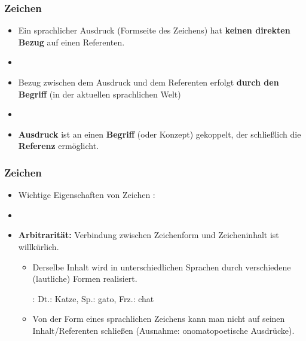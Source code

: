 \begin{frame}
	
\end{frame}	



\begin{frame}
\frametitle{Zeichen}

\begin{itemize}
	\item Ein sprachlicher Ausdruck (Formseite des Zeichens) hat \textbf{keinen direkten Bezug} auf einen Referenten.
	
	\item []	
	
	\item Bezug zwischen dem Ausdruck und dem Referenten erfolgt \textbf{durch den Begriff} (in der aktuellen sprachlichen Welt)
	
	\item[]
	
	\item \textbf{Ausdruck} ist an einen \textbf{Begriff} (oder Konzept) gekoppelt, der schließlich die \textbf{Referenz} ermöglicht.
		
\end{itemize}
	
\end{frame}


\begin{frame}
\frametitle{Zeichen}

\begin{itemize}
	\item Wichtige Eigenschaften von Zeichen \citep[vgl.][]{Saussure16x}:
	
	\item[]
		
	\item \textbf{Arbitrarität:} Verbindung zwischen Zeichenform und Zeicheninhalt ist willkürlich.
	
	\begin{itemize}
		\item Derselbe Inhalt wird in unterschiedlichen Sprachen durch verschiedene (lautliche) Formen realisiert.
		
		\ea {}: Dt.: Katze, Sp.: gato, Frz.: chat
		\z 
		
		\item Von der Form eines sprachlichen Zeichens kann man nicht auf seinen Inhalt/Referenten schließen (Ausnahme: onomatopoetische Ausdrücke).
	\end{itemize}
	

	
\end{itemize}

\end{frame}


